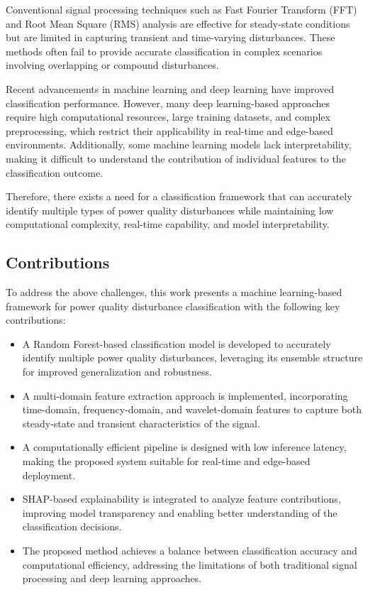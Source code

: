\documentclass[conference]{IEEEtran}
\begin{document}
Conventional signal processing techniques such as Fast Fourier Transform (FFT) and Root Mean Square (RMS) analysis are effective for steady-state conditions but are limited in capturing transient and time-varying disturbances. These methods often fail to provide accurate classification in complex scenarios involving overlapping or compound disturbances.

Recent advancements in machine learning and deep learning have improved classification performance. However, many deep learning-based approaches require high computational resources, large training datasets, and complex preprocessing, which restrict their applicability in real-time and edge-based environments. Additionally, some machine learning models lack interpretability, making it difficult to understand the contribution of individual features to the classification outcome.

Therefore, there exists a need for a classification framework that can accurately identify multiple types of power quality disturbances while maintaining low computational complexity, real-time capability, and model interpretability.

\subsection{Contributions}

To address the above challenges, this work presents a machine learning-based framework for power quality disturbance classification with the following key contributions:

\begin{itemize}
\item A Random Forest-based classification model is developed to accurately identify multiple power quality disturbances, leveraging its ensemble structure for improved generalization and robustness.

\item A multi-domain feature extraction approach is implemented, incorporating time-domain, frequency-domain, and wavelet-domain features to capture both steady-state and transient characteristics of the signal.

\item A computationally efficient pipeline is designed with low inference latency, making the proposed system suitable for real-time and edge-based deployment.

\item SHAP-based explainability is integrated to analyze feature contributions, improving model transparency and enabling better understanding of the classification decisions.

\item The proposed method achieves a balance between classification accuracy and computational efficiency, addressing the limitations of both traditional signal processing and deep learning approaches.
\end{itemize}
\end{document}
